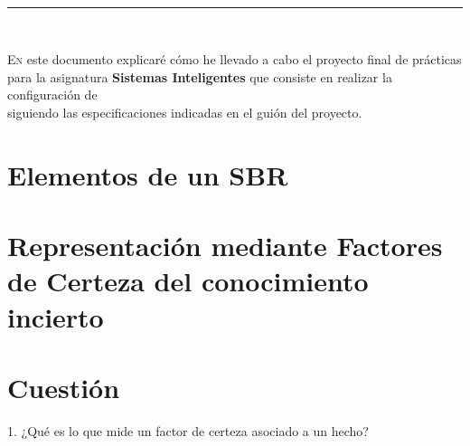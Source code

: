 
\begin{center}
	{\fboxrule=4pt } \\
	\setcounter{chapter}{1}
	\setcounter{section}{0}
	\rule{15cm}{0pt} \\
\end{center}

 
 \lettrine[lines=3, depth = 0]{E}{n} este documento explicar\'e c\'omo he llevado a cabo el proyecto final de prácticas para la asignatura \textbf{Sistemas Inteligentes} que consiste en realizar la configuraci\'on de 
 \\siguiendo las especificaciones indicadas en el gui\'on del proyecto.
 
\section{Elementos de un SBR}

\section{Representación mediante Factores de Certeza del conocimiento incierto}

\section{Cuestión}
\begin{ejer}
	1. ¿Qué es lo que mide un factor de certeza asociado a un hecho?
\end{ejer}

\newpage
{}